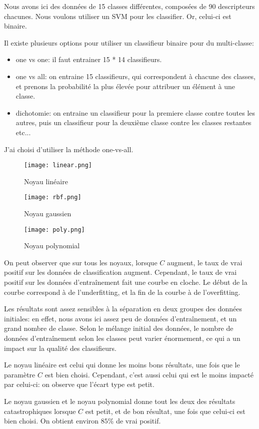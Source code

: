 \documentclass{article}
\begin{document}
Nous avons ici des données de 15 classes différentes, composées de 90
descripteurs chacunes. Nous voulons utiliser un SVM pour les classifier. Or,
celui-ci est binaire.

Il existe plusieurs options pour utiliser un classifieur binaire pour du
multi-classe:

\begin{itemize}
\item one vs one: il faut entrainer 15 * 14 classifieurs.
\item one vs all: on entraine 15 classifieurs, qui correspondent à chacune des
classes, et prenons la probabilité la plus élevée pour attribuer un élément à
une classe.
\item dichotomie: on entraine un classifieur pour la premiere classe contre
toutes les autres, puis un classifieur pour la deuxième classe contre les
classes restantes etc...
\end{itemize}

J'ai choisi d'utiliser la méthode one-vs-all.

\begin{figure}
\texttt{[image: linear.png]}
\caption{Noyau linéaire}
\end{figure}

\begin{figure}
\texttt{[image: rbf.png]}
\caption{Noyau gaussien}
\end{figure}

\begin{figure}
\texttt{[image: poly.png]}
\caption{Noyau polynomial}
\end{figure}

On peut observer que sur tous les noyaux, lorsque $C$ augment, le taux de vrai
positif sur les données de classification augment. Cependant, le taux de vrai
positif sur les données d'entraînement fait une courbe en cloche. Le début de
la courbe correspond à de l'underfitting, et la fin de la courbe à de
l'overfitting.

Les résultats sont assez sensibles à la séparation en deux groupes des données
initiales: en effet, nous avons ici assez peu de données d'entraînement, et un
grand nombre de classe. Selon le mélange initial des données, le nombre de
données d'entraînement selon les classes peut varier énormement, ce qui a un
impact sur la qualité des classifieurs.

Le noyau linéaire est celui qui donne les moins bons résultats, une fois que
le paramètre $C$ est bien choisi. Cependant, c'est aussi celui qui est le
moins impacté par celui-ci: on observe que l'écart type est petit.

Le noyau gaussien et le noyau polynomial donne tout les deux des résultats
catastrophiques lorsque $C$ est petit, et de bon résultat, une fois que
celui-ci est bien choisi. On obtient environ $85\%$ de vrai positif.
\end{document}
